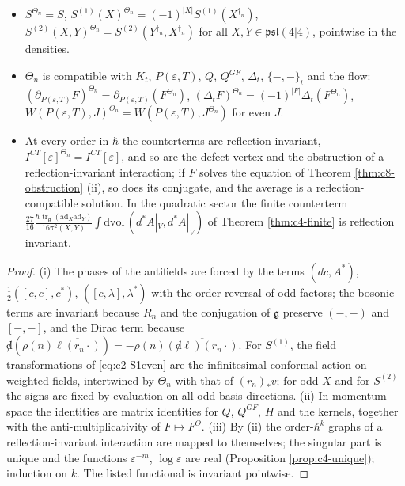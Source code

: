 \begin{theorem}
\label{thm:c8-fields}
\begin{itemize}
\item[(i)] $S^{\Theta_n}=S$, $S^{(1)}(X)^{\Theta_n}=(-1)^{|X|}S^{(1)}(X^{\dagger_n})$, $S^{(2)}(X,Y)^{\Theta_n}=S^{(2)}(Y^{\dagger_n},X^{\dagger_n})$ for all $X,Y\in\mathfrak{psl}(4|4)$, pointwise in the densities.
\item[(ii)] $\Theta_n$ is compatible with $K_t$, $P(\varepsilon,T)$, $Q$, $Q^{GF}$, $\Delta_t$, $\{-,-\}_t$ and the flow: $(\partial_{P(\varepsilon,T)}F)^{\Theta_n}=\partial_{P(\varepsilon,T)}(F^{\Theta_n})$, $(\Delta_tF)^{\Theta_n}=(-1)^{|F|}\Delta_t(F^{\Theta_n})$, $W(P(\varepsilon,T),J)^{\Theta_n}=W(P(\varepsilon,T),J^{\Theta_n})$ for even $J$.
\item[(iii)] At every order in $\hbar$ the counterterms are reflection invariant, $I^{CT}[\varepsilon]^{\Theta_n}=I^{CT}[\varepsilon]$, and so are the defect vertex and the obstruction of a reflection-invariant interaction; if $F$ solves the equation of Theorem \ref{thm:c8-obstruction} (ii), so does its conjugate, and the average is a reflection-compatible solution. In the quadratic sector the finite counterterm $\tfrac{27}{16}\frac{\hbar\operatorname{tr}_{\mathfrak g}(\mathrm{ad}_X\mathrm{ad}_Y)}{16\pi^2(X,Y)}\int\mathrm{dvol}\,(d^*A|_V,d^*A|_V)$ of Theorem \ref{thm:c4-finite} is reflection invariant.
\end{itemize}
\end{theorem}

\begin{proof}
(i) The phases of the antifields are forced by the terms $(dc,A^*)$, $\tfrac12([c,c],c^*)$, $([c,\lambda],\lambda^*)$ with the order reversal of odd factors; the bosonic terms are invariant because $R_n$ and the conjugation of $\mathfrak g$ preserve $(-,-)$ and $[-,-]$, and the Dirac term because ${\not d}(\rho(n)\overline{\ell(r_n\cdot)})=-\rho(n)\overline{({\not d}\ell)(r_n\cdot)}$. For $S^{(1)}$, the field transformations of \eqref{eq:c2-S1even} are the infinitesimal conformal action on weighted fields, intertwined by $\Theta_n$ with that of $(r_n)_*\bar v$; for odd $X$ and for $S^{(2)}$ the signs are fixed by evaluation on all odd basis directions. (ii) In momentum space the identities are matrix identities for $Q$, $Q^{GF}$, $H$ and the kernels, together with the anti-multiplicativity of $F\mapsto F^\Theta$. (iii) By (ii) the order-$\hbar^k$ graphs of a reflection-invariant interaction are mapped to themselves; the singular part is unique and the functions $\varepsilon^{-m}$, $\log\varepsilon$ are real (Proposition \ref{prop:c4-unique}); induction on $k$. The listed functional is invariant pointwise.
\end{proof}

